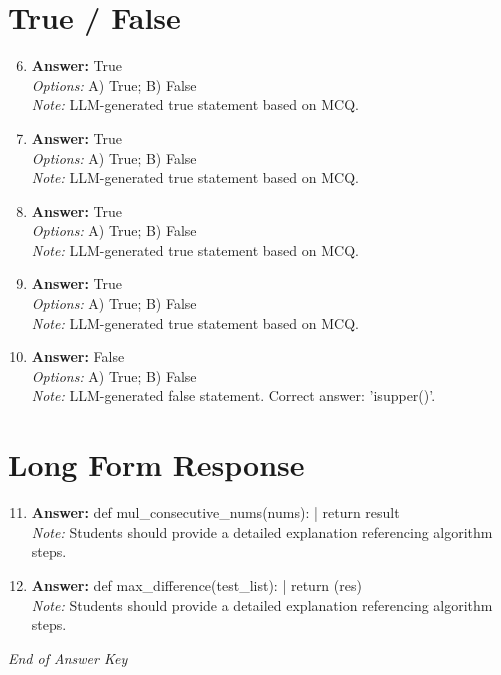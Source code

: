 \documentclass[12pt]{article}
\begin{document}
\section*{True / False}
\begin{enumerate}[label=\arabic*.]
\setcounter{enumi}{5}
\item \textbf{Answer:} True
\\ \textit{Options:} A) True; B) False
\\ \textit{Note:} LLM-generated true statement based on MCQ.
\item \textbf{Answer:} True
\\ \textit{Options:} A) True; B) False
\\ \textit{Note:} LLM-generated true statement based on MCQ.
\item \textbf{Answer:} True
\\ \textit{Options:} A) True; B) False
\\ \textit{Note:} LLM-generated true statement based on MCQ.
\item \textbf{Answer:} True
\\ \textit{Options:} A) True; B) False
\\ \textit{Note:} LLM-generated true statement based on MCQ.
\item \textbf{Answer:} False
\\ \textit{Options:} A) True; B) False
\\ \textit{Note:} LLM-generated false statement. Correct answer: 'isupper()'.
\end{enumerate}

\section*{Long Form Response}
\begin{enumerate}[label=\arabic*.]
\setcounter{enumi}{10}
\item \textbf{Answer:} def mul\_consecutive\_nums(nums): | return result
\\ \textit{Note:} Students should provide a detailed explanation referencing algorithm steps.
\item \textbf{Answer:} def max\_difference(test\_list): | return (res)
\\ \textit{Note:} Students should provide a detailed explanation referencing algorithm steps.
\end{enumerate}

\vfill
\noindent\textit{End of Answer Key}
\end{document}
